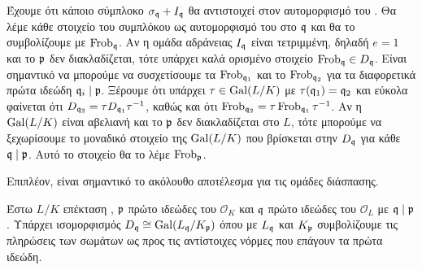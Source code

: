 \noindent Έχουμε ότι κάποιο σύμπλοκο $\sigma_{\mathfrak{q}} + I_{\mathfrak{q}}$ θα αντιστοιχεί στον αυτομορφισμό του . Θα λέμε κάθε στοιχείο του 
συμπλόκου ως αυτομορφισμό του  στο $\mathfrak{q}$ και θα το συμβολίζουμε με $\operatorname{Frob}_{\mathfrak{q}}$. Αν η ομάδα αδράνειας $I_{\mathfrak{q}}$ είναι τετριμμένη, 
δηλαδή $e=1$ και το $\mathfrak{p}$ δεν διακλαδίζεται, τότε υπάρχει καλά ορισμένο στοιχείο $\operatorname{Frob}_{\mathfrak{q}} \in D_{\mathfrak{q}}$. Είναι σημαντικό να μπορούμε να 
συσχετίσουμε τα $\operatorname{Frob}_{\mathfrak{q}_1}$ και το $\operatorname{Frob}_{\mathfrak{q}_2}$ για τα διαφορετικά πρώτα ιδεώδη $\mathfrak{q}_i \mid \mathfrak{p}$. Ξέρουμε ότι υπάρχει $\tau \in \operatorname{Gal}(L/K)$ με 
$\tau(\mathfrak{q}_1) = \mathfrak{q}_2$ και εύκολα φαίνεται ότι $D_{\mathfrak{q}_2} = \tau D_{\mathfrak{q}_1} \tau^{-1}$, καθώς και ότι $\operatorname{Frob}_{\mathfrak{q}_2} = \tau \operatorname{Frob}_{\mathfrak{q}_1} \tau^{-1}$. 
Αν η $\operatorname{Gal}(L/K)$ είναι αβελιανή και το $\mathfrak{p}$ δεν διακλαδίζεται στο $L$, τότε μπορούμε να ξεχωρίσουμε το μοναδικό στοιχείο της 
$\operatorname{Gal}(L/K)$ που βρίσκεται στην $D_{\mathfrak{q}}$ για κάθε $\mathfrak{q} \mid \mathfrak{p}$. Αυτό το στοιχείο θα το λέμε $\operatorname{Frob}_{\mathfrak{p}}$.

Επιπλέον, είναι σημαντικό το ακόλουθο αποτέλεσμα για τις ομάδες διάσπασης.



\begin{prop}
	Έστω $L/K$ επέκταση , $\mathfrak{p}$ πρώτο ιδεώδες του $\mathcal{O}_K$ και $\mathfrak{q}$ πρώτο ιδεώδες του $\mathcal{O}_L$ με $\mathfrak{q} \mid \mathfrak{p}$. 
	Υπάρχει ισομορφισμός $D_{\mathfrak{q}} \cong \operatorname{Gal}(L_{\mathfrak{q}}/K_{\mathfrak{p}})$ όπου με $L_{\mathfrak{q}}$ και $K_{\mathfrak{p}}$ συμβολίζουμε τις πληρώσεις των σωμάτων ως προς τις 
	αντίστοιχες νόρμες που επάγουν τα πρώτα ιδεώδη.
\end{prop}


